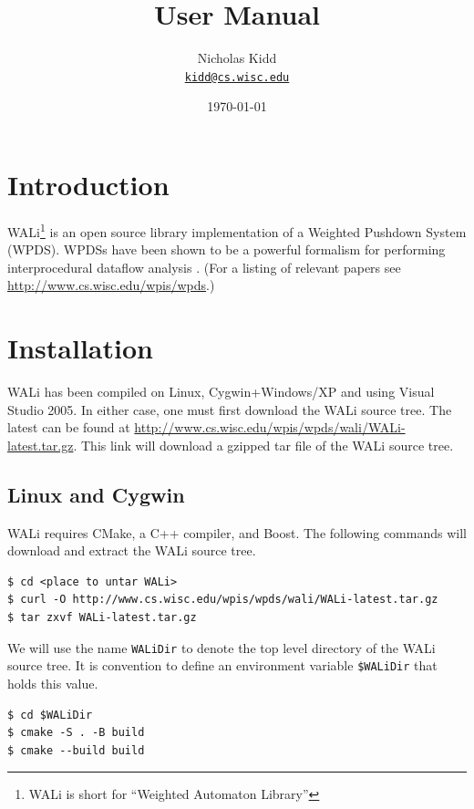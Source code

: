 \documentclass[english,a4paper,11pt]{article}
\title{\WALi User Manual}
\date{\today}
\author{ Nicholas Kidd \\ { \href{mailto:kidd@cs.wisc.edu}{\nolinkurl{kidd@cs.wisc.edu}}} }
\theoremstyle{definition}
\def\WALi{\textsf{WALi}\xspace}
\begin{document}
\maketitle

\section{Introduction}
\label{Se:Introduction}
\WALi\footnote{\WALi is short for ``Weighted Automaton Library''} is an open
source library implementation of a Weighted Pushdown System (WPDS). WPDSs have
been shown to be a powerful formalism for performing interprocedural dataflow
analysis \citep{SAS:RSJ:2003,SCP:RSJM:2005,FSTTCS:RLK:2007}. (For a listing of
relevant papers see \url{http://www.cs.wisc.edu/wpis/wpds}.)

\section{Installation}
\label{Se:Installation}
\WALi has been compiled on Linux, Cygwin+Windows/XP and using
Visual Studio 2005. In either case, one must first download the \WALi source
tree. The latest can be found at
\url{http://www.cs.wisc.edu/wpis/wpds/wali/WALi-latest.tar.gz}.
This link will download a gzipped tar file of the \WALi source tree.

\subsection{Linux and Cygwin}
\label{Se:Linux}
\WALi requires CMake, a C++ compiler, and Boost. The following commands will
download and extract the \WALi source tree.

\vspace{1em}
\noindent
\begin{cmdbox}
\begin{verbatim}
$ cd <place to untar WALi>
$ curl -O http://www.cs.wisc.edu/wpis/wpds/wali/WALi-latest.tar.gz 
$ tar zxvf WALi-latest.tar.gz
\end{verbatim}
\end{cmdbox}
\vspace{1em}

\noindent  We will use the name \verb!WALiDir! to denote the top level directory of the
\WALi source tree. It is convention to define an environment variable
\verb!$WALiDir! that holds this value.

\vspace{1em}
\noindent
\begin{cmdbox}
\begin{verbatim}
$ cd $WALiDir
$ cmake -S . -B build
$ cmake --build build
\end{verbatim}
\end{cmdbox}
\vspace{1em}
\end{document}
